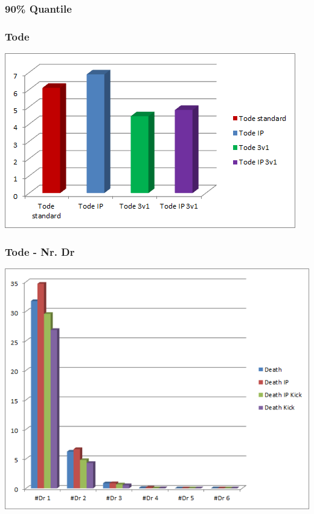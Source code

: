 \documentclass{beamer}
\begin{document}


\begin{frame}
	\frametitle{90\% Quantile}
\end{frame}

\begin{frame}
	\frametitle{Tode}
	\begin{center}
		\includegraphics[scale=0.77]{img/Deaths.png}
	\end{center}
\end{frame}

\begin{frame}
	\frametitle{Tode - Nr. Dr}
	\begin{center}
		\includegraphics[scale=0.65]{img/DeathsNrDr.png}
	\end{center}
\end{frame}

\end{document}
